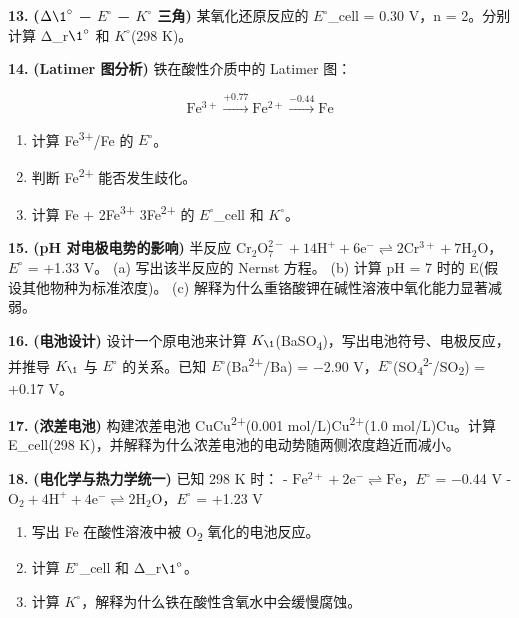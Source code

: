 \textbf{13.} \textbf{(\(\Delta \1^{\circ}\) − \(E^{\circ}\) − \(K^{\circ}\) 三角)} 某氧化还原反应的 \(E^{\circ}\)\_cell = 0.30 V，n = 2。分别计算 Δ\_r\(\1^{\circ}\) 和 \(K^{\circ}\)(298 K)。

\textbf{14.} \textbf{(Latimer 图分析)} 铁在酸性介质中的 Latimer 图：

\[\mathrm{Fe^{3+}} \xrightarrow{+0.77} \mathrm{Fe^{2+}} \xrightarrow{-0.44} \mathrm{Fe}\]

\begin{enumerate}
\def\labelenumi{(\alph{enumi})}
\tightlist
\item
  计算 Fe\textsuperscript{3+}/Fe 的 \(E^{\circ}\)。
\item
  判断 Fe\textsuperscript{2+} 能否发生歧化。
\item
  计算 Fe + 2Fe\textsuperscript{3+} \箭 3Fe\textsuperscript{2+} 的 \(E^{\circ}\)\_cell 和 \(K^{\circ}\)。
\end{enumerate}

\textbf{15.} \textbf{(pH 对电极电势的影响)} 半反应 \(\mathrm{Cr_2O_7^{2-} + 14H^+ + 6e^- \rightleftharpoons 2Cr^{3+} + 7H_2O}\)，\(E^{\circ}\) = +1.33 V。
(a) 写出该半反应的 Nernst 方程。
(b) 计算 pH = 7 时的 E(假设其他物种为标准浓度)。
(c) 解释为什么重铬酸钾在碱性溶液中氧化能力显著减弱。

\textbf{16.} \textbf{(电池设计)} 设计一个原电池来计算 \(K_{\1}\)(BaSO\textsubscript{4})，写出电池符号、电极反应，并推导 \(K_{\1}\) 与 \(E^{\circ}\) 的关系。已知 \(E^{\circ}\)(Ba\textsuperscript{2+}/Ba) = −2.90 V，\(E^{\circ}\)(SO\textsubscript{4}\textsuperscript{2-}/SO\textsubscript{2}) = +0.17 V。

\textbf{17.} \textbf{(浓差电池)} 构建浓差电池 Cu\textbar Cu\textsuperscript{2+}(0.001 mol/L)\textbar\textbar Cu\textsuperscript{2+}(1.0 mol/L)\textbar Cu。计算 E\_cell(298 K)，并解释为什么浓差电池的电动势随两侧浓度趋近而减小。

\textbf{18.} \textbf{(电化学与热力学统一)} 已知 298 K 时：
- \(\mathrm{Fe^{2+} + 2e^- \rightleftharpoons Fe}\)，\(E^{\circ}\) = −0.44 V
- \(\mathrm{O_2 + 4H^+ + 4e^- \rightleftharpoons 2H_2O}\)，\(E^{\circ}\) = +1.23 V

\begin{enumerate}
\def\labelenumi{(\alph{enumi})}
\tightlist
\item
  写出 Fe 在酸性溶液中被 O\textsubscript{2} 氧化的电池反应。
\item
  计算 \(E^{\circ}\)\_cell 和 Δ\_r\(\1^{\circ}\)。
\item
  计算 \(K^{\circ}\)，解释为什么铁在酸性含氧水中会缓慢腐蚀。
\end{enumerate}

